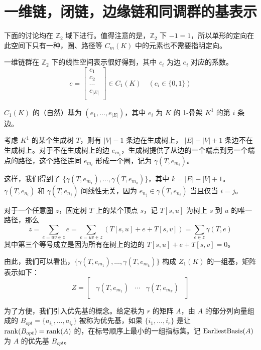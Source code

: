 \section{一维链，闭链，边缘链和同调群的基表示}

下面的讨论均在 $ \mathbb{Z}_2 $ 域下进行。值得注意的是，$ \mathbb{Z}_2 $ 下 $ -1 = 1 $，所以单形的定向在此空间下只有一种，圈、路径等 $ C_m(K) $ 中的元素也不需要指明定向。

一维链群在 $ \mathbb{Z}_2 $ 下的线性空间表示很好得到，其中 $ c_i $ 为边 $ e_i $ 对应的系数。
$$
c = \begin{bmatrix}
        c_1 \\
        c_2 \\
        \cdots \\
        c_{|E|} \\
    \end{bmatrix} \in C_1(K) \quad (c_i \in \{0, 1\})
$$

$ C_1(K) $ 的（自然）基为 $ (e_1, \dots, e_{|E|}) $，其中 $ e_i $ 为 $ K $ 的 1-骨架 $ K^1 $ 的第 $ i $ 条边。

考虑 $ K^1 $ 的某个生成树 $ T $，则有 $ |V| - 1 $ 条边在生成树上， $ |E| - |V| + 1 $ 条边不在生成树上。对于不在生成树上的边 $ e_{m_i} $，生成树提供了从边的一个端点到另一个端点的路径，这个路径连同 $ e_{m_i} $ 形成一个圈，记为 $ \gamma(T, e_{m_i}) $。

这样，我们得到了 $ \{ \gamma(T, e_{m_1}), \dots, \gamma(T, e_{m_{k}}) \} $，其中 $ k = |E| - |V| + 1 $。$ \gamma(T, e_{n_i}) $ 和 $ \gamma(T, e_{n_j}) $ 间线性无关，因为 $ e_{n_j} \in \gamma(T, e_{n_i}) $ 当且仅当 $ i = j $。

对于一个任意圈 $ z $，固定树 $ T $ 上的某个顶点 $ s $，记 $ T[s, u] $ 为树上 $ s $ 到 $ u $ 的唯一路径，那么
$$
z = \sum_{e=uv \in z} e = \sum_{e=uv \in z} (T[s, u] + e + T[s, v]) = \sum_{e \in z} \gamma(T, e)
$$
其中第三个等号成立是因为所有在树上的边的 $ T[s, u] + e + T[s, v] = 0 $。

由此，我们可以看出，$ \{ \gamma(T, e_{m_1}), \dots, \gamma(T, e_{m_{k}}) \} $ 构成 $ Z_1(K) $ 的一组基，矩阵表示如下：
$$
Z = 
\begin{bmatrix}
\begin{array}{c|c|c}
    \gamma(T, e_{m_1}) & \cdots & \gamma(T, e_{m_{k}})
\end{array}
\end{bmatrix}
$$

为了方便，我们引入优先基的概念。给定秩为 $ r $ 的矩阵 $ A $，由 $ A $ 的部分列向量组成的 $ B_{opt} = \{a_{i_1}, \dots, a_{i_r}\} $ 被称为优先基，如果 $ \{ i_1, \dots, i_r \} $ 是让 $ {\rm rank}(B_{opt}) = {\rm rank}(A) $ 的，在标号顺序上最小的一组指标集。记 $ {\rm EarliestBasis}(A) $ 为 $ A $ 的优先基 $ B_{opt} $。

